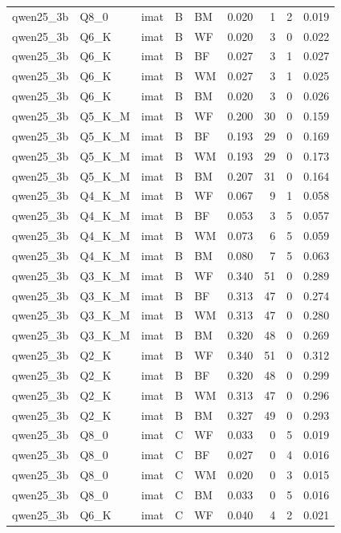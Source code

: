 \begin{tabular}{lllllrrrr}
qwen25\_3b & Q8\_0 & imat & B & BM & 0.020 & 1 & 2 & 0.019 \\
qwen25\_3b & Q6\_K & imat & B & WF & 0.020 & 3 & 0 & 0.022 \\
qwen25\_3b & Q6\_K & imat & B & BF & 0.027 & 3 & 1 & 0.027 \\
qwen25\_3b & Q6\_K & imat & B & WM & 0.027 & 3 & 1 & 0.025 \\
qwen25\_3b & Q6\_K & imat & B & BM & 0.020 & 3 & 0 & 0.026 \\
qwen25\_3b & Q5\_K\_M & imat & B & WF & 0.200 & 30 & 0 & 0.159 \\
qwen25\_3b & Q5\_K\_M & imat & B & BF & 0.193 & 29 & 0 & 0.169 \\
qwen25\_3b & Q5\_K\_M & imat & B & WM & 0.193 & 29 & 0 & 0.173 \\
qwen25\_3b & Q5\_K\_M & imat & B & BM & 0.207 & 31 & 0 & 0.164 \\
qwen25\_3b & Q4\_K\_M & imat & B & WF & 0.067 & 9 & 1 & 0.058 \\
qwen25\_3b & Q4\_K\_M & imat & B & BF & 0.053 & 3 & 5 & 0.057 \\
qwen25\_3b & Q4\_K\_M & imat & B & WM & 0.073 & 6 & 5 & 0.059 \\
qwen25\_3b & Q4\_K\_M & imat & B & BM & 0.080 & 7 & 5 & 0.063 \\
qwen25\_3b & Q3\_K\_M & imat & B & WF & 0.340 & 51 & 0 & 0.289 \\
qwen25\_3b & Q3\_K\_M & imat & B & BF & 0.313 & 47 & 0 & 0.274 \\
qwen25\_3b & Q3\_K\_M & imat & B & WM & 0.313 & 47 & 0 & 0.280 \\
qwen25\_3b & Q3\_K\_M & imat & B & BM & 0.320 & 48 & 0 & 0.269 \\
qwen25\_3b & Q2\_K & imat & B & WF & 0.340 & 51 & 0 & 0.312 \\
qwen25\_3b & Q2\_K & imat & B & BF & 0.320 & 48 & 0 & 0.299 \\
qwen25\_3b & Q2\_K & imat & B & WM & 0.313 & 47 & 0 & 0.296 \\
qwen25\_3b & Q2\_K & imat & B & BM & 0.327 & 49 & 0 & 0.293 \\
qwen25\_3b & Q8\_0 & imat & C & WF & 0.033 & 0 & 5 & 0.019 \\
qwen25\_3b & Q8\_0 & imat & C & BF & 0.027 & 0 & 4 & 0.016 \\
qwen25\_3b & Q8\_0 & imat & C & WM & 0.020 & 0 & 3 & 0.015 \\
qwen25\_3b & Q8\_0 & imat & C & BM & 0.033 & 0 & 5 & 0.016 \\
qwen25\_3b & Q6\_K & imat & C & WF & 0.040 & 4 & 2 & 0.021 \\

\end{tabular}
